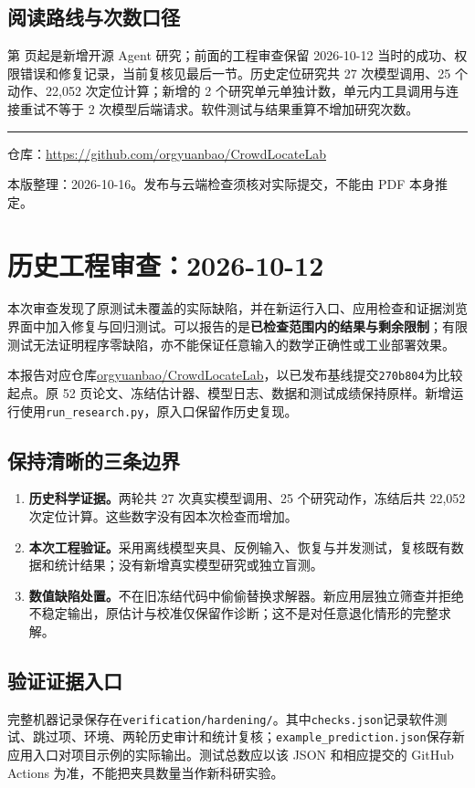 \documentclass[UTF8,a4paper,zihao=-4,fontset=none]{ctexart}
\newcommand{\code}[1]{{\small\nolinkurl{#1}}}
\begin{document}
\subsection*{阅读路线与次数口径}
第 \pageref{sec:upstream} 页起是新增开源 Agent 研究；前面的工程审查保留 2026-10-12 当时的成功、权限错误和修复记录，当前复核见最后一节。历史定位研究共 27 次模型调用、25 个动作、22,052 次定位计算；新增的 2 个研究单元单独计数，单元内工具调用与连接重试不等于 2 次模型后端请求。软件测试与结果重算不增加研究次数。

\vfill\noindent\textcolor{teal}{\rule{\textwidth}{.6pt}}
{\small\color{muted}仓库：\url{https://github.com/orgyuanbao/CrowdLocateLab}\par
本版整理：2026-10-16。发布与云端检查须核对实际提交，不能由 PDF 本身推定。}
\endgroup

\newpage
\section*{历史工程审查：2026-10-12}
本次审查发现了原测试未覆盖的实际缺陷，并在新运行入口、应用检查和证据浏览界面中加入修复与回归测试。可以报告的是\textbf{已检查范围内的结果与剩余限制}；有限测试无法证明程序零缺陷，亦不能保证任意输入的数学正确性或工业部署效果。

本报告对应仓库\href{https://github.com/orgyuanbao/CrowdLocateLab}{orgyuanbao/CrowdLocateLab}，以已发布基线提交\code{270b804}为比较起点。原 52 页论文、冻结估计器、模型日志、数据和测试成绩保持原样。新增运行使用\code{run_research.py}，原入口保留作历史复现。

\subsection*{保持清晰的三条边界}
\begin{enumerate}
\item \textbf{历史科学证据。}两轮共 27 次真实模型调用、25 个研究动作，冻结后共 22,052 次定位计算。这些数字没有因本次检查而增加。
\item \textbf{本次工程验证。}采用离线模型夹具、反例输入、恢复与并发测试，复核既有数据和统计结果；没有新增真实模型研究或独立盲测。
\item \textbf{数值缺陷处置。}不在旧冻结代码中偷偷替换求解器。新应用层独立筛查并拒绝不稳定输出，原估计与校准仅保留作诊断；这不是对任意退化情形的完整求解。
\end{enumerate}

\subsection*{验证证据入口}
完整机器记录保存在\code{verification/hardening/}。其中\code{checks.json}记录软件测试、跳过项、环境、两轮历史审计和统计复核；\code{example_prediction.json}保存新应用入口对项目示例的实际输出。测试总数应以该 JSON 和相应提交的 GitHub Actions 为准，不能把夹具数量当作新科研实验。
\end{document}
